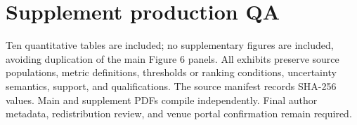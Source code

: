 \documentclass[preprint,12pt]{elsarticle}
\begin{document}
\section*{Supplement production QA}
Ten quantitative tables are included; no supplementary figures are included, avoiding duplication of the main Figure 6 panels. All exhibits preserve source populations, metric definitions, thresholds or ranking conditions, uncertainty semantics, support, and qualifications. The source manifest records SHA-256 values. Main and supplement PDFs compile independently. Final author metadata, redistribution review, and venue portal confirmation remain required.
\end{document}
